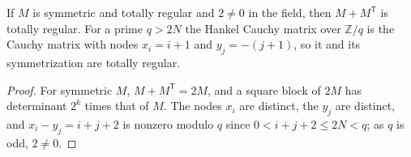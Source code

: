 \begin{lemma}
  \label{lem:lowerbounds-algebraic-hankel-cauchy}
  \leanok
  If $M$ is symmetric and totally regular and $2\ne0$ in the field, then
  $M+M^{\mathsf T}$ is totally regular. For a prime $q>2N$ the Hankel Cauchy
  matrix over $\mathbb{Z}/q$ is the Cauchy matrix with nodes $x_i=i+1$ and
  $y_j=-(j+1)$, so it and its symmetrization are totally regular.
\end{lemma}
\begin{proof}
  \leanok
  For symmetric $M$, $M+M^{\mathsf T}=2M$, and a square block of $2M$ has
  determinant $2^k$ times that of $M$. The nodes $x_i$ are distinct, the
  $y_j$ are distinct, and $x_i-y_j=i+j+2$ is nonzero modulo $q$ since
  $0<i+j+2\le2N<q$; as $q$ is odd, $2\ne0$.
\end{proof}

